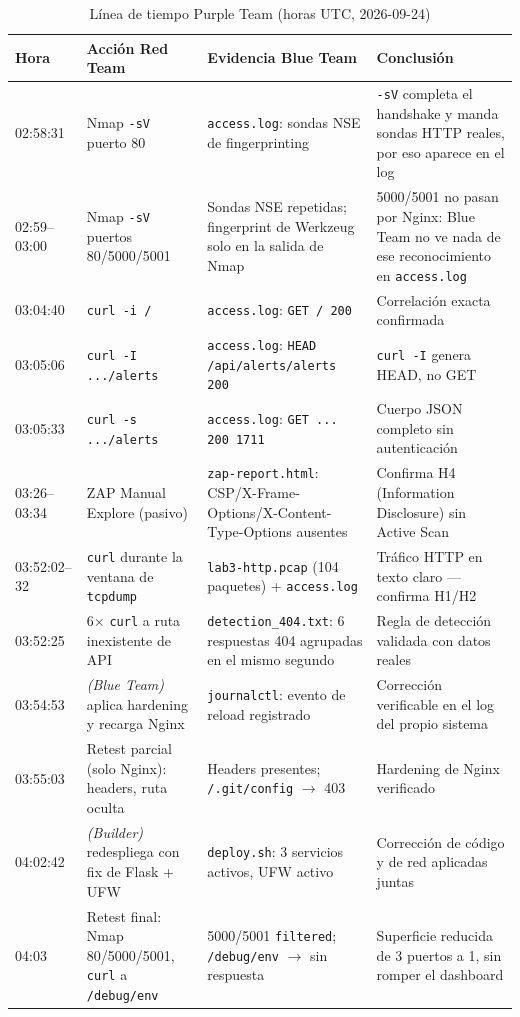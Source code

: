 \documentclass[journal]{IEEEtran}
\begin{document}
\clearpage
\begin{table}[p]
\centering
\caption{Línea de tiempo Purple Team (horas UTC, 2026-09-24)}
\label{tab:purple}
\tiny
\renewcommand{\arraystretch}{1.15}
\begin{tabular}{|p{1.3cm}|p{3.8cm}|p{4.8cm}|p{4.8cm}|}
\hline
\textbf{Hora} & \textbf{Acción Red Team} & \textbf{Evidencia Blue Team} & \textbf{Conclusión} \\
\hline
02:58:31 & Nmap \texttt{-sV} puerto 80 & \texttt{access.log}: sondas NSE de fingerprinting & \texttt{-sV} completa el handshake y manda sondas HTTP reales, por eso aparece en el log \\
\hline
02:59--03:00 & Nmap \texttt{-sV} puertos 80/5000/5001 & Sondas NSE repetidas; fingerprint de Werkzeug solo en la salida de Nmap & 5000/5001 no pasan por Nginx: Blue Team no ve nada de ese reconocimiento en \texttt{access.log} \\
\hline
03:04:40 & \texttt{curl -i /} & \texttt{access.log}: \texttt{GET / 200} & Correlación exacta confirmada \\
\hline
03:05:06 & \texttt{curl -I .../alerts} & \texttt{access.log}: \texttt{HEAD /api/alerts/alerts 200} & \texttt{curl -I} genera HEAD, no GET \\
\hline
03:05:33 & \texttt{curl -s .../alerts} & \texttt{access.log}: \texttt{GET ... 200 1711} & Cuerpo JSON completo sin autenticación \\
\hline
03:26--03:34 & ZAP Manual Explore (pasivo) & \texttt{zap-report.html}: CSP/X-Frame-Options/X-Content-Type-Options ausentes & Confirma H4 (Information Disclosure) sin Active Scan \\
\hline
03:52:02--32 & \texttt{curl} durante la ventana de \texttt{tcpdump} & \texttt{lab3-http.pcap} (104 paquetes) + \texttt{access.log} & Tráfico HTTP en texto claro --- confirma H1/H2 \\
\hline
03:52:25 & 6$\times$ \texttt{curl} a ruta inexistente de API & \texttt{detection\_404.txt}: 6 respuestas 404 agrupadas en el mismo segundo & Regla de detección validada con datos reales \\
\hline
03:54:53 & \textit{(Blue Team)} aplica hardening y recarga Nginx & \texttt{journalctl}: evento de reload registrado & Corrección verificable en el log del propio sistema \\
\hline
03:55:03 & Retest parcial (solo Nginx): headers, ruta oculta & Headers presentes; \texttt{/.git/config} $\to$ 403 & Hardening de Nginx verificado \\
\hline
04:02:42 & \textit{(Builder)} redespliega con fix de Flask + UFW & \texttt{deploy.sh}: 3 servicios activos, UFW activo & Corrección de código y de red aplicadas juntas \\
\hline
04:03 & Retest final: Nmap 80/5000/5001, \texttt{curl} a \texttt{/debug/env} & 5000/5001 \texttt{filtered}; \texttt{/debug/env} $\to$ sin respuesta & Superficie reducida de 3 puertos a 1, sin romper el dashboard \\
\hline
\end{tabular}
\end{table}
\end{document}
